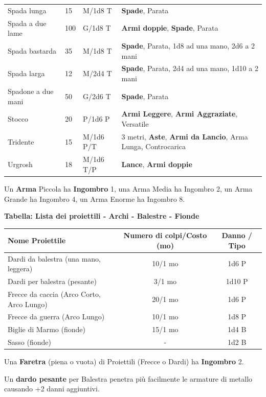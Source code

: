 \begin{xltabular}{1\textwidth}{lllX}
Spada lunga& 15 & M/1d8 T&\textbf{Spade}, Parata\\
Spada a due lame& 100& G/1d8 T& \textbf{Armi doppie}, \textbf{Spade}, Parata\\
Spada bastarda& 35 & M/1d8 T&\textbf{Spade}, Parata, 1d8 ad una mano, 2d6 a 2 mani\\
Spada larga& 12 & M/2d4 T&\textbf{Spade}, Parata, 2d4 ad una mano, 1d10 a 2 mani\\
Spadone a due mani& 50 & G/2d6 T&\textbf{Spade}, Parata\\
Stocco& 20 & P/1d6 P& \textbf{Armi Leggere}, \textbf{Armi Aggraziate}, Versatile\\
Tridente& 15 & M/1d6 P/T& 3 metri, \textbf{Aste}, \textbf{Armi da Lancio}, Arma Lunga, Controcarica\\
Urgrosh& 18 & M/1d6 T/P& \textbf{Lance}, \textbf{Armi doppie}\\
\end{xltabular}

\medskip

Un \textbf{Arma} Piccola ha \textbf{Ingombro} 1, una Arma Media ha Ingombro 2, un Arma Grande ha Ingombro 4, un Arma Enorme ha Ingombro 8.

\medskip

\textbf{Tabella: Lista dei proiettili - Archi - Balestre - Fionde}\label{proiettili}

\begin{tabular}{lcc}
\textbf{Nome Proiettile}& \textbf{Numero di colpi/Costo (mo)} & \textbf{Danno / Tipo}\\
\toprule
Dardi da balestra (una mano, leggera) & 10/1 mo & 1d6 P\\
Dardi per balestra (pesante) & 3/1 mo & 1d10 P\\
Frecce da caccia (Arco Corto, Arco Lungo)& 20/1 mo & 1d6 P\\
Frecce da guerra (Arco Lungo)& 10/1 mo & 1d8 P\\
Biglie di Marmo (fionde)& 15/1 mo & 1d4 B\\
Sasso (fionde)& -& 1d2 B
\end{tabular}

\medskip

Una \textbf{Faretra} (piena o vuota) di Proiettili (Frecce o Dardi) ha \textbf{Ingombro} 2.

Un \textbf{dardo pesante} per Balestra penetra più facilmente le armature di metallo causando +2 danni aggiuntivi.

